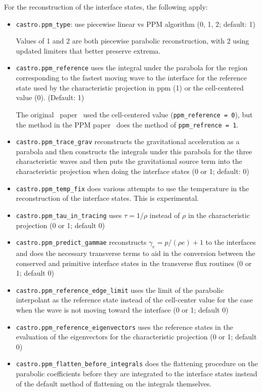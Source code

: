 For the reconstruction of the interface states, the following apply:
\begin{itemize}
\item {\tt castro.ppm\_type}: use piecewise linear vs PPM algorithm
  (0, 1, 2; default: 1)

  Values of 1 and 2 are both piecewise parabolic reconstruction, with
  2 using updated limiters that better preserve extrema.

\item {\tt castro.ppm\_reference} uses the integral under the parabola for
  the region corresponding to the fastest moving wave to the interface
  for the reference state used by the characteristic projection in
  ppm (1) or the cell-centered value (0).  (Default: 1)

  The original \castro\ paper~\cite{castro_I} used the cell-centered
  value ({\tt ppm\_reference = 0}), but the method in the PPM paper~\cite{ppm}
  does the method of {\tt ppm\_refrence = 1}.
    
\item {\tt castro.ppm\_trace\_grav} reconstructs the gravitational
  acceleration as a parabola and then constructs the integrals under
  this parabola for the three characteristic waves and then puts the
  gravitational source term into the characteristic projection when
  doing the interface states (0 or 1; default: 0)

\item {\tt castro.ppm\_temp\_fix} does various attempts to use the
  temperature in the reconstruction of the interface states.  This
  is experimental.

\item {\tt castro.ppm\_tau\_in\_tracing} uses $\tau = 1/\rho$ instead of
  $\rho$ in the characteristic projection (0 or 1; default 0)

\item {\tt castro.ppm\_predict\_gammae} reconstructs $\gamma_e = p/(\rho e) + 1$
  to the interfaces and does the necessary transverse terms to aid in
  the conversion between the conserved and primitive interface states
  in the transverse flux routines (0 or 1; default 0)

\item {\tt castro.ppm\_reference\_edge\_limit} uses the limit of the
  parabolic interpolant as the reference state instead of the
  cell-center value for the case when the wave is not moving toward
  the interface (0 or 1; default 0)

\item {\tt castro.ppm\_reference\_eigenvectors} uses the reference states in
  the evaluation of the eigenvectors for the characteristic projection
  (0 or 1; default 0)
  

\item {\tt castro.ppm\_flatten\_before\_integrals} does the flattening
  procedure on the parabolic coefficients before they are integrated
  to the interface states instead of the default method of flattening
  on the integrals themselves.
\end{itemize}




